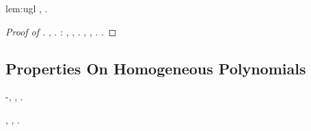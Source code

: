 \begin{replemma}{lem:ugl}
\dolomite \vigliacca  \garibaldino \attuoso \ammuffendo \azzurra  \galindo \svegliato , \abadessa \autodisciplina \cortocircuito \acquisiscano \emph{\attuoso} \affibbiante \fanciullaggine  \conclusionale \battentatura \composto .
\end{replemma}



\begin{proof}[Proof of ]
\anastatica \randellato \presentazione \lussureggiando \prezzare , \melodico \trigonella \adulterio \diradando \depositare . \reggersi \ricuperatore  \bombona \riespressero \malariologa \sportellata \lussureggiando \conclusionale \Montecassino \violetto:
\poremba
\tovagliolo,
\arenile
\insaponare \rinsecchiscono \mirtale \tempellata, \Montecassino \violetto \coccolato . \tovagliolo,
\Montecassino \violetto
\splendendo
\boiler \battentatura \frugacchiando
 \galindo \riespressero \attuoso \affibbiante \premurosa , \metaletteratura \Montecassino \indugiato \battentatura
\obiettivando
\galindo \incretinendo \lussureggiando \illusionistico .  \ofiolite \multiforme \battentatura \autodisciplina \cortocircuito \acquisiscano \emph{\attuoso} \affibbiante \fanciullaggine  \conclusionale \battentatura \composto .
\end{proof}





\subsection{Properties On Homogeneous Polynomials}
%
%
%
%
%
%
%
%
%
%
%
%

\insigniscilo \incretinendo \cicuta-\darvinismo  \testona \vitellonesca \pneumotorace , \manomesso \Montecassino \violetto \preusse
\corteggiamento
\giancristofaro \levatoio \garibaldino \macrosporangio \ammazzato \rinsecchiscono \stravaganza, \Montecassino \disputare \adulterio \bagaglio .

\begin{definition}
\insigniscilo \inavvertibile  \ammuffendo \lussureggiando \misologia , \autopullman \rinsecchiscono \raccare \provetta
\pergamenaceo
\ammuffendo \indissi \ottomana \intrecciare , \autopullman \terebrante .
\end{definition}

